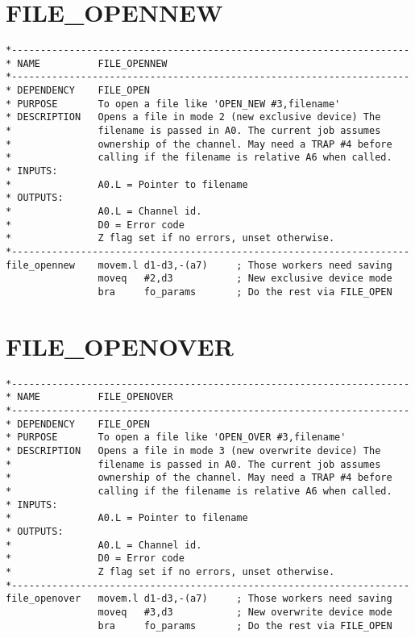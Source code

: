 \section{FILE\_OPENNEW}
\label{ch9-FILE_OPENNEW}%

\begin{lstlisting}[firstnumber=1,caption={FILE\_OPENNEW}]
*---------------------------------------------------------------------
* NAME          FILE_OPENNEW
*---------------------------------------------------------------------
* DEPENDENCY    FILE_OPEN
* PURPOSE       To open a file like 'OPEN_NEW #3,filename'
* DESCRIPTION   Opens a file in mode 2 (new exclusive device) The 
*               filename is passed in A0. The current job assumes
*               ownership of the channel. May need a TRAP #4 before 
*               calling if the filename is relative A6 when called.
* INPUTS:
*               A0.L = Pointer to filename
* OUTPUTS:
*               A0.L = Channel id.
*               D0 = Error code
*               Z flag set if no errors, unset otherwise.
*---------------------------------------------------------------------
file_opennew    movem.l d1-d3,-(a7)     ; Those workers need saving
                moveq   #2,d3           ; New exclusive device mode
                bra     fo_params       ; Do the rest via FILE_OPEN
\end{lstlisting}

\section{FILE\_OPENOVER}
\label{ch9-FILE_OPENOVER}%

\begin{lstlisting}[firstnumber=1,caption={FILE\_OPENOVER}]
*---------------------------------------------------------------------
* NAME          FILE_OPENOVER
*---------------------------------------------------------------------
* DEPENDENCY    FILE_OPEN
* PURPOSE       To open a file like 'OPEN_OVER #3,filename'
* DESCRIPTION   Opens a file in mode 3 (new overwrite device) The
*               filename is passed in A0. The current job assumes
*               ownership of the channel. May need a TRAP #4 before 
*               calling if the filename is relative A6 when called.
* INPUTS:
*               A0.L = Pointer to filename
* OUTPUTS:
*               A0.L = Channel id.
*               D0 = Error code
*               Z flag set if no errors, unset otherwise.
*---------------------------------------------------------------------
file_openover   movem.l d1-d3,-(a7)     ; Those workers need saving
                moveq   #3,d3           ; New overwrite device mode
                bra     fo_params       ; Do the rest via FILE_OPEN
\end{lstlisting}

